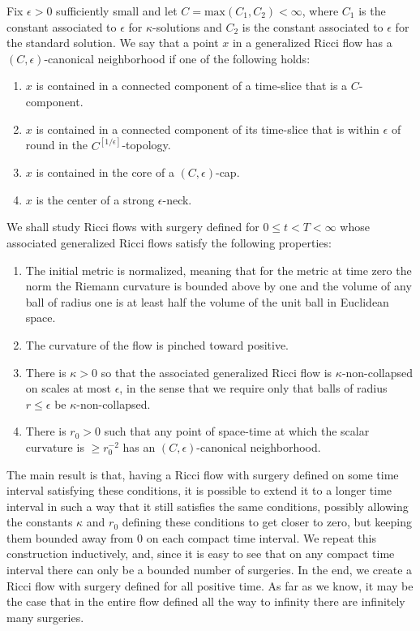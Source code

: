 Fix $\epsilon>0$ sufficiently small and let $C=\mathrm{max}(C_1,C_2)<\infty$, where $C_1$ is the constant associated to
$\epsilon$ for $\kappa$-solutions and $C_2$ is the constant
associated to $\epsilon$ for the standard solution. We say that a
point $x$ in a generalized Ricci flow has a $(C,\epsilon)$-canonical
neighborhood if one of the following holds:
\begin{enumerate}
\item $x$ is contained in a connected component of a
time-slice that is a $C$-component.
\item $x$ is contained in a connected component of its time-slice
that is within $\epsilon$ of round in the
$C^{[1/\epsilon]}$-topology.
\item $x$ is contained in the core of a $(C,\epsilon)$-cap.
\item $x$ is the center of a strong $\epsilon$-neck.
\end{enumerate}


We shall study  Ricci flows with surgery defined for $0\le
t<T<\infty$ whose associated generalized Ricci flows satisfy the
following properties:
\begin{enumerate}
\item The initial metric is normalized, meaning that for the
metric at time zero the norm the Riemann curvature is bounded above
by one and the volume of any ball of radius one is at least half the
volume of the unit ball in Euclidean space.
\item The curvature of the flow is pinched toward positive.
\item There is $\kappa>0$ so that the associated generalized Ricci flow is
$\kappa$-non-collapsed on scales at most $\epsilon$, in the sense
that we require only that balls of radius $r\le \epsilon$ be
$\kappa$-non-collapsed.
\item There is $r_0>0$ such that any point of space-time at which
the scalar curvature is $\ge r_0^{-2}$ has an
$(C,\epsilon)$-canonical neighborhood.
\end{enumerate}

The main result is that, having a Ricci flow with surgery defined on
some time interval satisfying these conditions, it is possible to
extend it to a longer time interval in such a way that it still
satisfies the same conditions, possibly allowing the constants
$\kappa$ and $r_0$ defining these conditions to get closer to zero,
but keeping them bounded away from $0$ on each compact time
interval. We repeat this construction inductively, and, since it is
easy to see that on any compact time interval there can only be a
bounded number of surgeries. In the end, we create a Ricci flow with
surgery defined for all positive time. As far as we know, it may be
the case that in the entire flow defined all the way to infinity
there are infinitely many surgeries.




